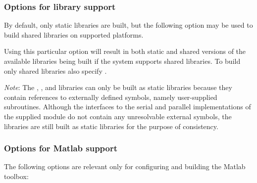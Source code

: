 \subsubsection*{Options for library support}

\noindent By default, only static libraries are built, but the following option
may be used to build shared libraries on supported platforms.

\begin{config}

\item {}

  Using this particular option will result in both static and shared versions of
  the available {\sundials} libraries being built if the system supports shared
  libraries. To build only shared libraries also specify .

  {\em Note}: The {\fcvode}, {\fkinsol}, and {\fida} libraries can only be built as
  static libraries because they contain references to externally defined symbols,
  namely user-supplied {\F} subroutines.  Although the {\F} interfaces to the serial
  and parallel implementations of the supplied {\nvector} module do not contain any
  unresolvable external symbols, the libraries are still built as static libraries
  for the purpose of consistency.

\end{config}


\subsubsection*{Options for Matlab support}

\noindent The following options are relevant only for configuring and building 
the {\sundialsTB} Matlab toolbox:

